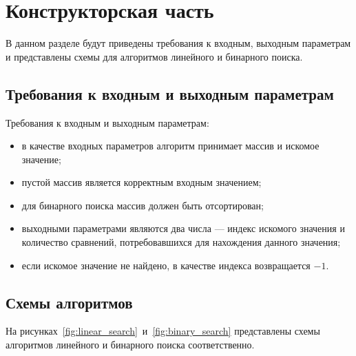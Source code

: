 \section{Конструкторская часть}

В данном разделе будут приведены требования к входным, выходным параметрам и представлены схемы для алгоритмов линейного и бинарного поиска.

\subsection{Требования к входным и выходным параметрам}

Требования к входным и выходным параметрам:
\begin{itemize}
    \item в качестве входных параметров алгоритм принимает массив и искомое значение;
    \item пустой массив является корректным входным значением;
    \item для бинарного поиска массив должен быть отсортирован;
    \item выходными параметрами являются два числа --- индекс искомого значения и количество сравнений, потребовавшихся для нахождения данного значения;
    \item если искомое значение не найдено, в качестве индекса возвращается $-1$.
\end{itemize}

\subsection{Схемы алгоритмов}

На рисунках~\ref{fig:linear_search}~и~\ref{fig:binary_search} представлены схемы алгоритмов линейного и бинарного поиска соответственно.

